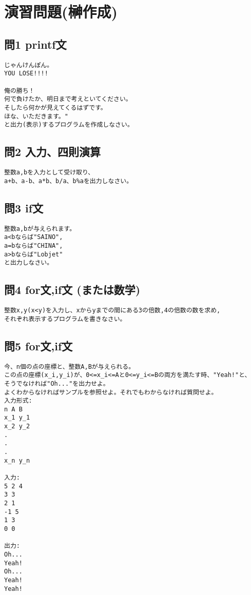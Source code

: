 \section{演習問題(榊作成)}



\subsection{問1 printf文}
\begin{verbatim}
じゃんけんぽん。
YOU LOSE!!!!

俺の勝ち！
何で負けたか、明日まで考えといてください。
そしたら何かが見えてくるはずです。
ほな、いただきます。"
と出力(表示)するプログラムを作成しなさい。
\end{verbatim}
\subsection{問2 入力、四則演算}
\begin{verbatim}
整数a,bを入力として受け取り、
a+b、a-b、a*b、b/a、b%aを出力しなさい。
\end{verbatim}

\subsection{問3 if文}
\begin{verbatim}
整数a,bが与えられます。
a<bならば"SAINO",
a=bならば"CHINA",
a>bならば"Lobjet"
と出力しなさい。
\end{verbatim}

\subsection{問4 for文,if文 (または数学) }
\begin{verbatim}
整数x,y(x<y)を入力し、xからyまでの間にある3の倍数,4の倍数の数を求め,
それぞれ表示するプログラムを書きなさい。
\end{verbatim}
\subsection{問5 for文,if文}
\begin{verbatim}
今、n個の点の座標と、整数A,Bが与えられる。
この点の座標(x_i,y_i)が、0<=x_i<=Aと0<=y_i<=Bの両方を満たす時、"Yeah!"と、
そうでなければ"Oh..."を出力せよ。
よくわからなければサンプルを参照せよ。それでもわからなければ質問せよ。
入力形式:
n A B
x_1 y_1
x_2 y_2
.
.
.
x_n y_n

入力:
5 2 4
3 3
2 1
-1 5
1 3
0 0

出力:
Oh...
Yeah!
Oh...
Yeah!
Yeah!
\end{verbatim}

